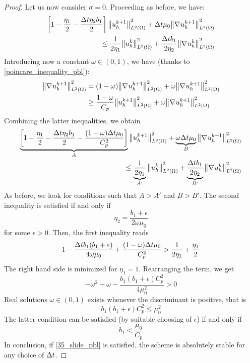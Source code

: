 \begin{proof}
    Let us now consider \(\sigma= 0\). Proceeding as before, we have: 
    \begin{equation*}
        \begin{split}
            \left[ 1-\frac{\eta_1}{2} - \frac{\Delta t \eta_2 b_1}{2} \right] \norm{u_h^{k+1}}_{L^2(\Omega)}^2 + \Delta t \mu_0 \norm{\nabla\mspace{1mu} u_h^{k+1}}_{L^2(\Omega)}^2 \\ 
            \leq \frac{1}{2\eta_1} \norm{u_h^{k}}_{L^2(\Omega)}^2 + \frac{\Delta t b_1}{2 \eta_2} \norm{\nabla\mspace{1mu} u_h^{k}}_{L^2(\Omega)}^2
        \end{split}
    \end{equation*}
    Introducing now a constant \(\omega \in (0,1)\), we have (thanks to \eqref{poincare_inequality_pbl}):
    \begin{equation*}
        \begin{aligned}
            \norm{\nabla\mspace{1mu} u_h^{k+1}}_{L^2(\Omega)}^2 &= (1-\omega) \norm{\nabla\mspace{1mu} u_h^{k+1}}_{L^2(\Omega)}^2 + \omega \norm{ \nabla\mspace{1mu} u_h^{k+1}}_{L^2(\Omega)}^2 \\
            &\geq \frac{1-\omega}{C_p} \norm{u_h^{k+1}}_{L^2(\Omega)}^2 + \omega \norm{\nabla\mspace{1mu} u_h^{k+1}}_{L^2(\Omega)}^2
        \end{aligned}
    \end{equation*}
    Combining the latter inequalities, we obtain 
    \begin{equation*}
        \begin{split}
            \underbrace{\left[ 1 - \frac{\eta_1}{2} - \frac{\Delta t \eta_2 b_1}{2} - \frac{(1-\omega)\Delta t \mu_0}{C_p^2}\right]}_{A} \norm{u_h^{k+1}}_{L^2(\Omega)}^2 + \underbrace{\omega \Delta t \mu_0}_{B} \norm{\nabla\mspace{1mu} u_h^{k+1}}_{L^2(\Omega)}^2 \\
            \leq \underbrace{\frac{1}{2\eta_1}}_{A'} \norm{u_h^{k}}_{L^2(\Omega)}^2 + \underbrace{\frac{\Delta t b_1}{2 \eta_2}}_{B'} \norm{\nabla\mspace{1mu} u_h^{k}}_{L^2(\Omega)}^2 
        \end{split}
    \end{equation*}
    As before, we look for conditions such that \(A >A'\) and \(B>B'\). The second inequality is satisfied if and only if
    \[
        \eta_2 =\frac{b_1 + \epsilon}{2\omega \mu_0}
    \]
    for some \(\epsilon > 0\).
    Then, the first inequality reads
    \[
        1 - \frac{\Delta t b_1 (b_1 + \varepsilon)}{4\omega \mu_0} + \frac{(1-\omega) \Delta t \mu_0}{C^2_p} > \frac{1}{2\eta_1} + \frac{\eta_1}{2}
    \]
    The right hand side is minimized for \(\eta_1 = 1\). Rearranging the term, we get 
    \begin{equation}
        -\omega^2 + \omega -\frac{b_1(b_1 +\epsilon)C_p^2}{4\mu_0^2} > 0
        \label{34_slide_pbl}
    \end{equation}
    Real solutions \(\omega \in (0,1)\) exists whenever the discriminant is positive, that is 
    \[
        b_1(b_1+\epsilon)C_p^2 \leq \mu_0^2
    \]
    The latter condition can be satisfied (by suitable choosing of \(\epsilon\)) if and only if 
    \begin{equation}
        b_1 < \frac{\mu_0}{C_p}
        \label{35_slide_pbl}
    \end{equation}
    In conclusion, if \eqref{35_slide_pbl} is satisfied, the scheme is absolutely stable for any choice of \(\Delta t\).
\end{proof}
